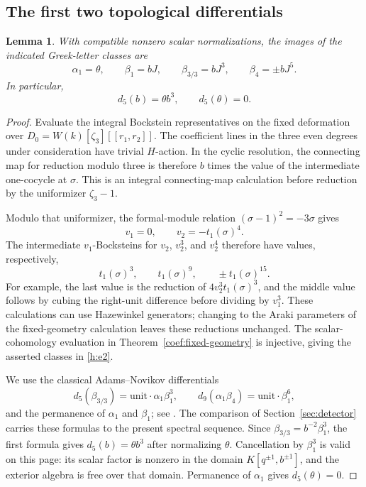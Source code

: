 \documentclass[11pt]{article}
\newtheorem{lemma}[theorem]{Lemma}
\theoremstyle{definition}
\theoremstyle{remark}
\numberwithin{equation}{section}
\begin{document}
\subsection{The first two topological differentials}

\begin{lemma}
 \label{h:greek-evaluation}
 With compatible nonzero scalar normalizations, the images of the
 indicated Greek-letter classes are
 \[
  \alpha_1=\theta,\qquad
  \beta_1=bJ,\qquad
  \beta_{3/3}=bJ^3,\qquad
  \beta_4=\pm bJ^5.
 \]
 In particular,
 \begin{equation}
 \label{h:d5-b}
  d_5(b)=\theta b^3,\qquad d_5(\theta)=0.
 \end{equation}
\end{lemma}

\begin{proof}
Evaluate the integral Bockstein representatives on the fixed deformation
over $D_0=W(k)[\zeta_3][[r_1,r_2]]$. The coefficient lines in the three
even degrees under consideration have trivial $H$-action. In the cyclic
resolution, the connecting map for reduction modulo three is therefore
$b$ times the value of the intermediate one-cocycle at $\sigma$.
This is an integral connecting-map calculation before reduction by the
uniformizer $\zeta_3-1$.

Modulo that uniformizer, the formal-module relation
$(\sigma-1)^2=-3\sigma$ gives
\[
 v_1=0,\qquad v_2=-t_1(\sigma)^4.
\]
The intermediate $v_1$-Bocksteins for $v_2$, $v_2^3$, and $v_2^4$
therefore have values, respectively,
\[
 t_1(\sigma)^3,\qquad t_1(\sigma)^9,\qquad
 \pm t_1(\sigma)^{15}.
\]
For example, the last value is the reduction of
$4v_2^3t_1(\sigma)^3$, and the middle value follows by cubing the
right-unit difference before dividing by $v_1^3$. These calculations
can use Hazewinkel generators; changing to the Araki parameters of the
fixed-geometry calculation leaves these reductions unchanged.
The scalar-cohomology evaluation in
Theorem~\ref{coef:fixed-geometry} is injective, giving the asserted
classes in \eqref{h:e2}.

We use the classical Adams--Novikov differentials
\begin{equation}
 \label{h:classical-differentials}
 d_5(\beta_{3/3})=\text{unit}\cdot\alpha_1\beta_1^3,
 \qquad
 d_9(\alpha_1\beta_4)=\text{unit}\cdot\beta_1^6,
\end{equation}
and the permanence of $\alpha_1$ and $\beta_1$; see
\cite[Lemma 2.5 and Table 1]{BelmontShimomura}.
The comparison of Section~\ref{sec:detector} carries these formulas to
the present spectral sequence. Since
$\beta_{3/3}=b^{-2}\beta_1^3$, the first formula gives
$d_5(b)=\theta b^3$ after normalizing $\theta$. Cancellation by
$\beta_1^3$ is valid on this page: its scalar factor is nonzero in the
domain $K[q^{\pm1},b^{\pm1}]$, and the exterior algebra is free over
that domain. Permanence of $\alpha_1$ gives $d_5(\theta)=0$.
\end{proof}
\end{document}
